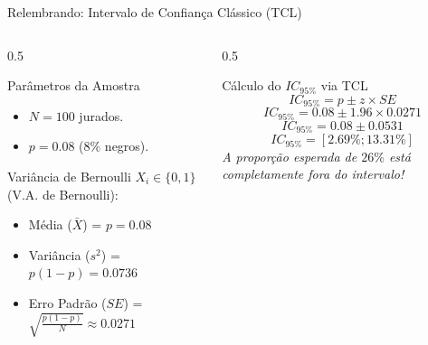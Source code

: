 \begin{frame}{Relembrando: Intervalo de Confiança Clássico (TCL)}
    \begin{columns}
        \begin{column}{0.5\textwidth}
            \begin{block}{Parâmetros da Amostra}
                \begin{itemize}
                    \item $N = 100$ jurados.
                    \item $p = 0.08$ ($8\%$ negros).
                \end{itemize}
            \end{block}
            \begin{block}{Variância de Bernoulli}
                $X_i \in \{0, 1\}$ (V.A. de Bernoulli):
                \begin{itemize}
                    \item Média ($\bar{X}$) = $p = 0.08$
                    \item Variância ($s^2$) = $p(1 - p) = 0.0736$
                    \item Erro Padrão ($SE$) = $\sqrt{\frac{p(1 - p)}{N}} \approx 0.0271$
                \end{itemize}
            \end{block}
        \end{column}
        \begin{column}{0.5\textwidth}
            \begin{alertblock}{Cálculo do $IC_{95\%}$ via TCL}
                $$IC_{95\%} = p \pm z \times SE$$
                $$IC_{95\%} = 0.08 \pm 1.96 \times 0.0271$$
                $$IC_{95\%} = 0.08 \pm 0.0531$$
                $$IC_{95\%} = [2.69\%; 13.31\%]$$
                \vspace{0.1cm}
                {\footnotesize \textit{A proporção esperada de $26\%$ está completamente fora do intervalo!}}
            \end{alertblock}
        \end{column}
    \end{columns}
\end{frame}

